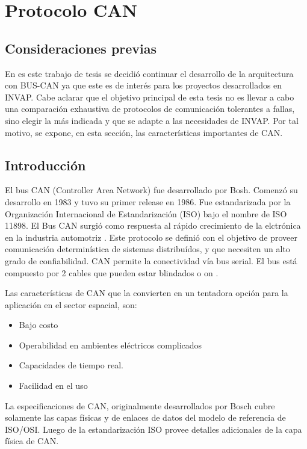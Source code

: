 \section{Protocolo CAN} \label{seccion:ProtocoloCAN}
\subsection{Consideraciones previas}
En es este trabajo de tesis se decidió continuar el desarrollo de la arquitectura con BUS-CAN ya que este es de interés para los proyectos desarrollados en INVAP. Cabe aclarar que el objetivo principal de esta tesis no es llevar a cabo una comparación exhaustiva de protocolos de comunicación tolerantes a fallas, sino elegir la más indicada y que se adapte a las necesidades de INVAP. Por tal motivo, se expone, en esta sección, las características importantes de CAN.

\subsection{Introducción}
El bus CAN (Controller Area Network) fue desarrollado por Bosh. Comenzó su desarrollo en 1983 y tuvo su primer release en 1986. Fue estandarizada por la Organización Internacional de Estandarización (ISO) bajo el nombre de  ISO 11898. El Bus CAN surgió como respuesta al rápido crecimiento de la elctrónica en la industria automotriz \citep{esdWEB}. Este protocolo se definió con el objetivo de proveer comunicación determinística de sistemas distribuídos, y que necesiten un alto grado de confiabilidad. CAN permite la conectividad vía bus serial. El bus está compuesto por  2 cables que pueden estar blindados o on \citep{esdWEB}.

Las características de CAN que la convierten en un tentadora opción para la aplicación en el sector espacial, son:
\begin{itemize}
  \item Bajo costo
  \item Operabilidad en ambientes eléctricos complicados
  \item Capacidades de tiempo real.
  \item Facilidad en el uso
\end{itemize}

La especificaciones de CAN, originalmente desarrollados por Bosch cubre solamente las capas físicas y de enlaces de datos del modelo de referencia de ISO/OSI. Luego de la estandarización ISO provee detalles adicionales de la capa física de CAN.

